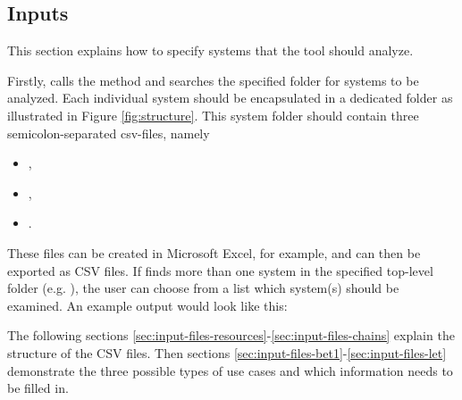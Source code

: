 \subsection{Inputs}
\label{sec:input-files}
This section explains how to specify systems that the tool \Tool should analyze.
\bigskip

Firstly, \Tool calls the method  and searches the specified folder for systems to be analyzed. 
Each individual system should be encapsulated in a dedicated folder as illustrated in Figure \ref{fig:structure}.
This system folder should contain three semicolon-separated csv-files, namely
\begin{itemize}[itemsep=0pt]
	\item {}, 
	\item {}, 
	\item {}. 
\end{itemize}
These files can be created in Microsoft Excel, for example, and can then be exported as CSV files.
If \Tool finds more than one system in the specified top-level folder (e.g. ), the user can choose from a list which system(s) should be examined. 
An example output would look like this:
\begin{tcolorbox}
\small
{}
\end{tcolorbox}

The following sections \ref{sec:input-files-resources}-\ref{sec:input-files-chains} explain the structure of the CSV files. 
Then sections \ref{sec:input-files-bet1}-\ref{sec:input-files-let} demonstrate the three possible types of use cases and which information needs to be filled in.


